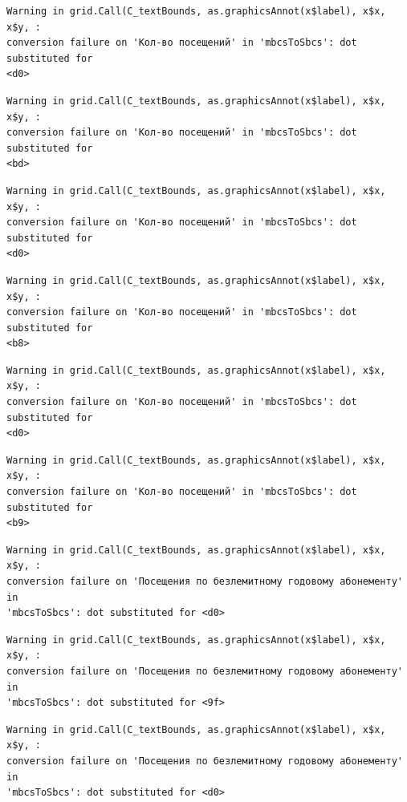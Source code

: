 \documentclass[
  letterpaper,
  DIV=11,
  numbers=noendperiod]{scrartcl}
\begin{document}
\begin{verbatim}
Warning in grid.Call(C_textBounds, as.graphicsAnnot(x$label), x$x, x$y, :
conversion failure on 'Кол-во посещений' in 'mbcsToSbcs': dot substituted for
<d0>
\end{verbatim}

\begin{verbatim}
Warning in grid.Call(C_textBounds, as.graphicsAnnot(x$label), x$x, x$y, :
conversion failure on 'Кол-во посещений' in 'mbcsToSbcs': dot substituted for
<bd>
\end{verbatim}

\begin{verbatim}
Warning in grid.Call(C_textBounds, as.graphicsAnnot(x$label), x$x, x$y, :
conversion failure on 'Кол-во посещений' in 'mbcsToSbcs': dot substituted for
<d0>
\end{verbatim}

\begin{verbatim}
Warning in grid.Call(C_textBounds, as.graphicsAnnot(x$label), x$x, x$y, :
conversion failure on 'Кол-во посещений' in 'mbcsToSbcs': dot substituted for
<b8>
\end{verbatim}

\begin{verbatim}
Warning in grid.Call(C_textBounds, as.graphicsAnnot(x$label), x$x, x$y, :
conversion failure on 'Кол-во посещений' in 'mbcsToSbcs': dot substituted for
<d0>
\end{verbatim}

\begin{verbatim}
Warning in grid.Call(C_textBounds, as.graphicsAnnot(x$label), x$x, x$y, :
conversion failure on 'Кол-во посещений' in 'mbcsToSbcs': dot substituted for
<b9>
\end{verbatim}

\begin{verbatim}
Warning in grid.Call(C_textBounds, as.graphicsAnnot(x$label), x$x, x$y, :
conversion failure on 'Посещения по безлемитному годовому абонементу' in
'mbcsToSbcs': dot substituted for <d0>
\end{verbatim}

\begin{verbatim}
Warning in grid.Call(C_textBounds, as.graphicsAnnot(x$label), x$x, x$y, :
conversion failure on 'Посещения по безлемитному годовому абонементу' in
'mbcsToSbcs': dot substituted for <9f>
\end{verbatim}

\begin{verbatim}
Warning in grid.Call(C_textBounds, as.graphicsAnnot(x$label), x$x, x$y, :
conversion failure on 'Посещения по безлемитному годовому абонементу' in
'mbcsToSbcs': dot substituted for <d0>
\end{verbatim}
\end{document}
